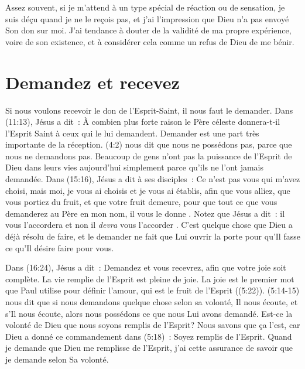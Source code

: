 Assez souvent, si je m'attend à un type spécial de réaction ou de sensation,
 je suis déçu quand je ne le reçois pas, et j'ai l'impression que Dieu
 n'a pas envoyé Son don sur moi. J'ai tendance à douter de la validité
 de ma propre expérience, 
 voire de son existence, et à considérer cela
 comme un refus de Dieu de me bénir.


\section{Demandez et recevez}

Si nous voulons recevoir le don de l'Esprit-Saint,
 il nous faut le demander. Dans (11:13), Jésus a dit~:
 \Og À combien plus forte raison le Père céleste donnera-t-il
 l'Esprit Saint à ceux qui le lui demandent. \Fg{}
 Demander est une part très importante de la réception.
 (4:2) nous dit que nous ne possédons pas,
 parce que nous ne demandons pas. Beaucoup de gens n'ont pas
 la puissance de l'Esprit de Dieu dans leurs vies aujourd'hui
 simplement parce qu'ils ne l'ont jamais demandée.
 Dans (15:16), Jésus a dit à ses disciples~:
 \Og Ce n'est pas vous qui m'avez choisi, mais moi,
 je vous ai choisis et je vous ai établis, afin que vous alliez,
 que vous portiez du fruit, et que votre fruit demeure,
 pour que tout ce que vous demanderez au Père en mon nom,
 il vous le donne . \Fg{}
 Notez que Jésus a dit~: \Og il vous l'accordera \Fg{} et non
 \Og il \emph{devra} vous l'accorder \Fg{}.
 C'est quelque chose que Dieu a déjà résolu de faire,
 et le demander ne fait que Lui ouvrir la porte pour qu'Il fasse
 ce qu'Il désire faire pour vous.

Dans (16:24), Jésus a dit~:
 \Og Demandez et vous recevrez, afin que votre joie soit complète. \Fg{}
 La vie remplie de l'Esprit est pleine de joie.
 La joie est le premier mot que Paul utilise pour définir l'amour,
 qui est le fruit de l'Esprit ((5:22)).
 (5:14-15) nous dit que si nous demandons quelque chose
 selon sa volonté, Il nous écoute, et s'Il nous écoute,
 alors nous possédons ce que nous Lui avons demandé.
 Est-ce la volonté de Dieu que nous soyons remplis de l'Esprit?
 Nous savons que ça l'est, car Dieu a donné ce commandement dans
 (5:18)~: \Og Soyez remplis de l'Esprit. \Fg{}
 Quand je demande que Dieu me remplisse de l'Esprit,
 j'ai cette assurance de savoir que je demande selon Sa volonté.

